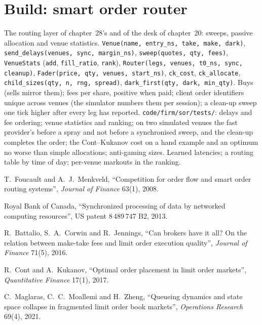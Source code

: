 \section{Build: smart order router}\label{bld:mx:smart-order-routing:sor}

\begin{build}
 The routing layer of chapter~28's  and of the desk of chapter~20: sweeps, passive allocation and venue statistics.
 \texttt{Venue(name, entry\_ns, take, make, dark)}, \texttt{send\_delays(venues, sync, margin\_ns)}, \texttt{sweep(quotes, qty,
fees)}, \texttt{VenueStats} (\texttt{add}, \texttt{fill\_ratio}, \texttt{rank}), \texttt{Router(legs, venues, t0\_ns, sync, cleanup)},
\texttt{Fader(price, qty, venues, start\_ns)}, \texttt{ck\_cost}, \texttt{ck\_allocate}, \texttt{child\_sizes(qty, n, rng, spread)},
\texttt{dark\_first(qty, dark, min\_qty)}.
 Buys (sells mirror them); fees per share, positive when paid; client order identifiers unique across venues (the simulator numbers them
per session); a clean-up sweep one tick higher after every leg has reported.
 \texttt{code/firm/sor/tests/}: delays and fee ordering; venue statistics and ranking; on two simulated venues the fast
provider's  before a spray and not before a synchronised sweep, and the clean-up completes the order; the Cont--Kukanov cost on a hand
example and an optimum no worse than simple allocations; anti-gaming sizes.
 Learned latencies; a routing table by time of day; per-venue markouts in the ranking.
\end{build}

\begin{omsources}
\item T.~Foucault and A.~J.~Menkveld, ``Competition for order flow and smart order routing systems'', \emph{Journal of Finance} 63(1), 2008.
\item Royal Bank of Canada, ``Synchronized processing of data by networked computing resources'', US patent 8\,489\,747 B2, 2013.
\item R.~Battalio, S.~A.~Corwin and R.~Jennings, ``Can brokers have it all? On the relation between make-take fees and limit order execution
quality'', \emph{Journal of Finance} 71(5), 2016.
\item R.~Cont and A.~Kukanov, ``Optimal order placement in limit order markets'', \emph{Quantitative Finance} 17(1), 2017.
\item C.~Maglaras, C.~C.~Moallemi and H.~Zheng, ``Queueing dynamics and state space collapse in fragmented limit order book markets'',
\emph{Operations Research} 69(4), 2021.
\end{omsources}

